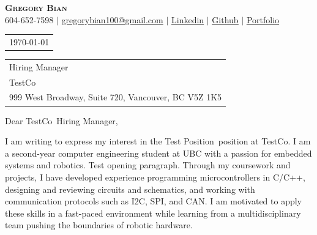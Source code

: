 \documentclass[letterpaper,11pt]{article}
\newcommand{\company}{TestCo}
\newcommand{\position}{Test Position}
\newcommand{\employer}{}
\newcommand{\address}{999 West Broadway, Suite 720, Vancouver, BC V5Z 1K5}
\newcommand{\bs}{Test opening paragraph.}
\begin{document}

\begin{center}
    \textbf{\Huge \scshape Gregory Bian} \\ \vspace{1pt}
    \small 604-652-7598 $|$ \href{mailto:gregorybian100@gmail.com}{gregorybian100@gmail.com} $|$ 
     \href{https://www.linkedin.com/in/gregorybian/}{\underline{Linkedin}} $|$
     \href{https://github.com/gregorybian}{\underline{Github}} $|$
    \href{https://gregorybian.github.io}{\underline{Portfolio}}
\end{center}\vspace{-1em} 

\vspace{1em}
\begin{tabular}{l @{}}
    \today \\ %
\end{tabular}

\begin{tabular}{@{} l}
	\employer    \\
	Hiring Manager \\
	\company \\
    \address \\

\end{tabular}

\bigskip %

Dear \company\ Hiring Manager,


I am writing to express my interest in the \position\ position at \company. I am a second-year computer engineering student at UBC with a passion for embedded systems and robotics. \bs{} Through my coursework and projects, I have developed experience programming microcontrollers in C/C++, designing and reviewing circuits and schematics, and working with communication protocols such as I2C, SPI, and CAN. I am motivated to apply these skills in a fast-paced environment while learning from a multidisciplinary team pushing the boundaries of robotic hardware.
\end{document}
